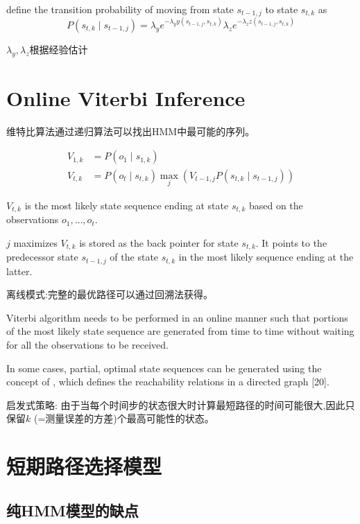 define the transition probability of moving from state $ s_{t-1, j} $ to state $ s_{t, k} $ as
$$
P\left(s_{t, k} \mid s_{t-1, j}\right)=\lambda_{y} e^{-\lambda_{y} y\left(s_{t-1, j}, s_{t, k}\right)} \lambda_{z} e^{-\lambda_{z} z\left(s_{t-1, j}, s_{t, k}\right)}
$$

$\lambda_{y}, \lambda_{z}$根据经验估计

\section{Online Viterbi Inference}

维特比算法通过递归算法可以找出HMM中最可能的序列。 

$$ \begin{aligned} V_{1, k} &=P\left(o_{1} \mid s_{1, k}\right) \\ V_{t, k} &=P\left(o_{t} \mid s_{t, k}\right) \max _{j}\left(V_{t-1, j} P\left(s_{t, k} \mid s_{t-1, j}\right)\right) \end{aligned} $$

$ V_{t, k} $ is the most likely state sequence ending at state $ s_{t, k} $ based on the observations $ o_{1}, \ldots, o_{t} . $

$j$ maximizes
$V_{t, k}$ is stored as the back pointer for state $s_{t, k}$. It points to the predecessor state $s_{t-1, j}$ of the state $s_{t, k}$ in the most likely sequence ending at the latter.

离线模式:完整的最优路径可以通过回溯法获得。

Viterbi algorithm needs to be performed in
an online manner such that portions of the most likely state
sequence are generated from time to time without waiting for
all the observations to be received.

In some cases, partial,
optimal state sequences can be generated using the concept
of , which defines the reachability relations
in a directed graph [20].

启发式策略: 由于当每个时间步的状态很大时计算最短路径的时间可能很大,因此只保留$k$ (=测量误差的方差)个最高可能性的状态。

\section{短期路径选择模型}

\subsection{纯HMM模型的缺点}

